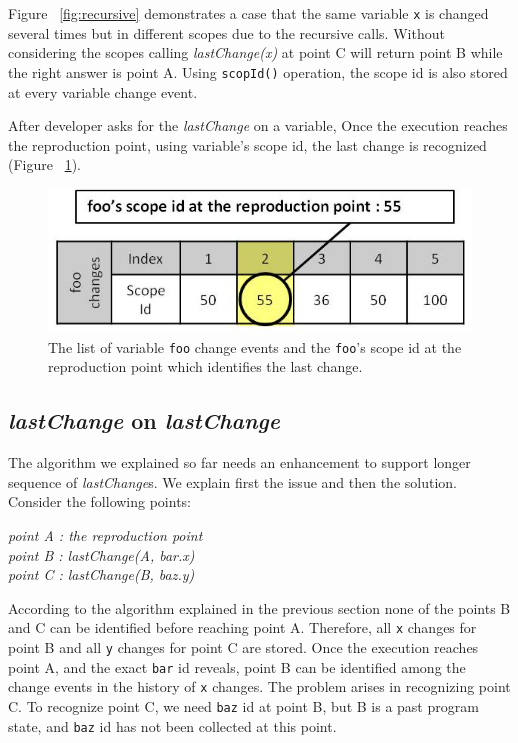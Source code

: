 \documentclass[preprint]{sigplanconf}
\begin{document}
Figure ~\ref{fig:recursive} demonstrates a case that the same variable
\texttt{x} is changed several times but in different scopes due to the
recursive calls. Without considering the scopes calling \textit{lastChange(x)}
at point C will return point B while the right answer is point A. Using
\texttt{scopId()} operation, the scope id is also stored at every variable
change event.
 
After developer asks for the \textit{lastChange} on a variable, 
Once the execution reaches the reproduction point, using variable's scope
id, the last change is recognized (Figure ~\ref{fig:foo-changes2}).

\begin{figure}[htp]
\includegraphics[width=.48\textwidth]{7-foo-changes2.jpg}
\caption{The list of variable \texttt{foo} change events and the
  \texttt{foo}'s scope id at the reproduction point which identifies
  the last change.}
\label{fig:foo-changes2}
\end{figure}

 
\subsection{\textit{lastChange} on \textit{lastChange}}
The algorithm we explained so far needs an enhancement to support
longer sequence of \textit{lastChange}s. We explain first the issue
and then the solution. Consider the following points:

\begin{center}
\textit{
 point A : the reproduction point \\
 point B : lastChange(A, bar.x) \\
 point C : lastChange(B, baz.y) 
 }
 \end{center}
According to the algorithm explained in the previous section none of
the points B and C can be identified before reaching point
A. Therefore, all \texttt{x} changes for point B and all \texttt{y}
changes for point C are stored. Once the execution reaches point A,
and the exact \texttt{bar} id reveals, point B can be identified among
the change events in the history of \texttt{x} changes. The problem
arises in recognizing point C. To recognize point C, we need
\texttt{baz} id at point B, but B is a past program state, and
\texttt{baz} id has not been collected at this point.
\end{document}
